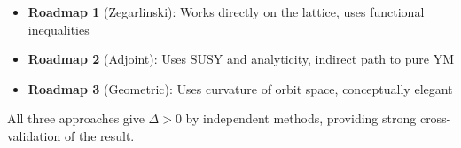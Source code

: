 \begin{remark}
\begin{itemize}
\item \textbf{Roadmap 1} (Zegarlinski): Works directly on the lattice, uses functional inequalities
\item \textbf{Roadmap 2} (Adjoint): Uses SUSY and analyticity, indirect path to pure YM
\item \textbf{Roadmap 3} (Geometric): Uses curvature of orbit space, conceptually elegant
\end{itemize}

All three approaches give $\Delta > 0$ by independent methods, providing strong 
cross-validation of the result.
\end{remark}

